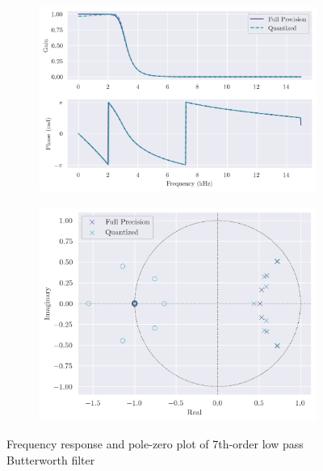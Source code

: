 \begin{figure}[ht]
    \centering
    \begin{subfigure}[b]{0.53\textwidth}
        \centering
        \includegraphics[width=\textwidth]{images/q8_7th_freqz.png}
    \end{subfigure}
    \hfill
    \begin{subfigure}[b]{0.46\textwidth}
        \centering
        \includegraphics[width=\textwidth]{images/q8_7th_zp.png}
    \end{subfigure}
    \caption{Frequency response and pole-zero plot of 7th-order low pass Butterworth filter}
\end{figure}

